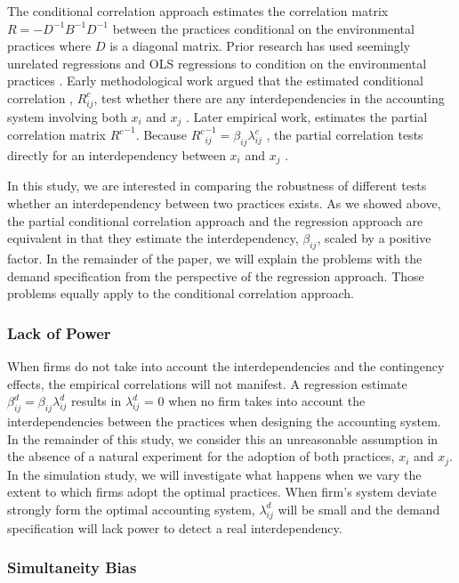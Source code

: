 \documentclass[12pt]{article}
\begin{document}
The conditional correlation approach estimates the correlation matrix $R = -D^{-1}B^{-1}D^{-1}$ between the practices  conditional on the environmental practices where $D$ is a diagonal matrix. Prior research has used seemingly unrelated regressions and OLS regressions to condition on the environmental practices \citep{Indjejikian2012, Matejka2017BalancingEvidence}. Early methodological work argued that the estimated conditional correlation , $R^c_{ij}$, test whether there are any interdependencies in the accounting system involving both $x_i$ and $x_j$ \citep{Arora1996}.  Later empirical work, estimates the partial correlation matrix ${R^c}^{-1}$. Because ${R^c}^{-1}_{ij} = \beta_{ij} \lambda^c_{ij}$ , the partial correlation tests directly for an interdependency between $x_i$ and $x_j$ \citep{Indjejikian2012}. 

In this study, we are interested in comparing the robustness of different tests whether an interdependency between two practices exists. As we showed above, the partial conditional correlation approach and the regression approach are equivalent in that they estimate the interdependency, $\beta_{ij}$, scaled by a positive factor. In the remainder of the paper, we will explain the problems with the demand specification from the perspective of the regression approach. Those problems equally apply to the conditional correlation approach.  

\subsubsection{Lack of Power}

When firms do not take into account the interdependencies and the contingency effects, the empirical correlations will not manifest. A regression estimate $\beta^d_{ij} = \beta_{ij} \lambda^d_{ij}$ results in $\lambda^d_{ij}$ = 0 when no firm takes into account the interdependencies between the practices when designing the accounting system. In the remainder of this study, we consider this an unreasonable  assumption in the absence of a natural experiment for the adoption of both practices, $x_i$ and $x_j$. In the simulation study, we will investigate what happens when we vary the extent to which firms adopt the optimal practices. When firm's system deviate strongly form the optimal accounting system, $\lambda^d_{ij}$ will be small and the demand specification will lack power to detect a real interdependency.

\subsubsection{Simultaneity Bias}
\end{document}
